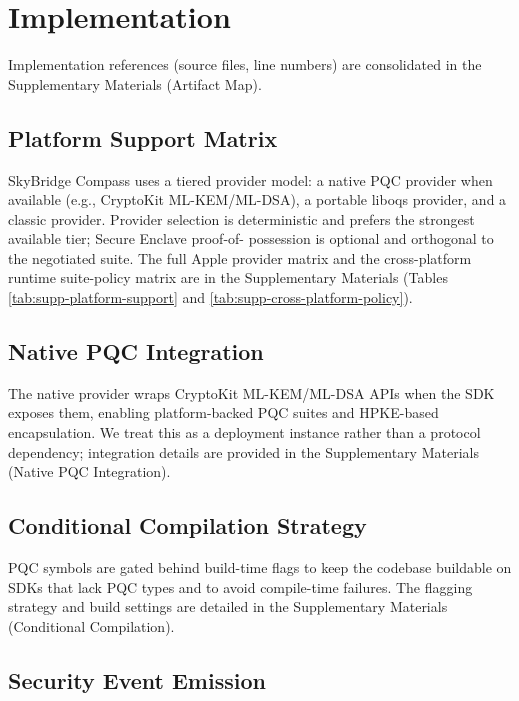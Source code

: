\documentclass[10pt,journal,compsoc]{IEEEtran}
\begin{document}
\section{Implementation}\label{sec:implementation}

Implementation references (source files, line numbers) are consolidated in the Supplementary Materials (Artifact Map).

\subsection{Platform Support
Matrix}\label{a.-platform-support-matrix}

SkyBridge Compass uses a tiered provider model: a native PQC provider
when available (e.g., CryptoKit ML-KEM/ML-DSA), a portable liboqs
provider, and a classic provider. Provider selection is deterministic
and prefers the strongest available tier; Secure Enclave proof-of-
possession is optional and orthogonal to the negotiated suite. The full
Apple provider matrix and the cross-platform runtime suite-policy matrix
are in the Supplementary Materials (Tables
\ref{tab:supp-platform-support} and \ref{tab:supp-cross-platform-policy}).

\subsection{Native PQC Integration}\label{b.-apple-pqc-integration}

The native provider wraps CryptoKit ML-KEM/ML-DSA APIs \cite{ref1,ref34} when the
SDK exposes them, enabling platform-backed PQC suites and HPKE-based
encapsulation. We treat this as a deployment instance rather than a
protocol dependency; integration details are provided in the
Supplementary Materials (Native PQC Integration).

\subsection{Conditional Compilation
Strategy}\label{c.-conditional-compilation-strategy}

PQC symbols are gated behind build-time flags to keep the codebase
buildable on SDKs that lack PQC types and to avoid compile-time
failures. The flagging strategy and build settings are detailed in the
Supplementary Materials (Conditional Compilation).

\subsection{Security Event
Emission}\label{d.-security-event-emission}
\end{document}
